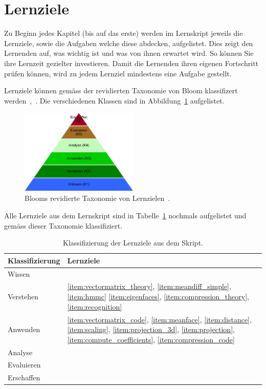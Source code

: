 \section{Lernziele}
Zu Beginn jedes Kapitel (bis auf das erste) werden im Lernskript jeweils die Lernziele, sowie die Aufgaben welche diese abdecken, aufgelistet.
Dies zeigt den Lernenden auf, was wichtig ist und was von ihnen erwartet wird.
So können Sie ihre Lernzeit gezielter investieren.
Damit die Lernenden ihren eigenen Fortschritt prüfen können, wird zu jedem Lernziel mindestens eine Aufgabe gestellt.

Lernziele können gemäss der revidierten Taxonomie von Bloom klassifizert werden~\cite{Bloom1956},~\cite{Anderson2001}.
Die verschiedenen Klassen sind in Abbildung~\ref{fig:taxonomie} aufgelistet.
\begin{figure}[ht]
	\centering
	\includegraphics[width=0.5\textwidth]{images/taxonomie}
	\caption{Blooms revidierte Taxonomie von Lernzielen~\cite{Anderson2001}.}
	\label{fig:taxonomie}
\end{figure}
Alle Lernziele aus dem Lernskript sind in Tabelle~\ref{tab:lernziele} nochmals aufgelistet und gemäss dieser Taxonomie klassifiziert.
\begin{table}[ht]
	\centering
	\begin{tabular}{|l|l|}
		\hline
		Klassifizierung & Lernziele \\ \hline
		Wissen &  \\
		Verstehen & \ref{item:vectormatrix_theory}, \ref{item:meandiff_simple}, \ref{item:hmmc} \ref{item:eigenfaces}, \ref{item:compression_theory}, \ref{item:recognition}  \\
		Anwenden & \ref{item:vectormatrix_code}, \ref{item:meanface}, \ref{item:distance}, \ref{item:scaling}, \ref{item:projection_3d}, \ref{item:projection}, \ref{item:compute_coefficients}, \ref{item:compression_code}  \\
		Analyse &  \\
		Evaluieren &  \\
		Erschaffen &  \\
		\hline
	\end{tabular}
	\caption{Klassifizierung der Lernziele aus dem Skript.}
	\label{tab:lernziele} 
\end{table}